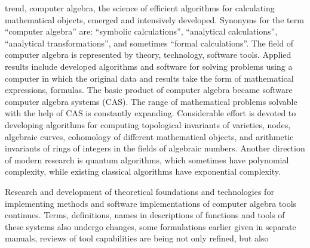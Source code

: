 \documentclass{article}
\begin{document}
\begin{multicols}{2}
trend, computer algebra, the science of efficient algorithms for calculating mathematical objects, emerged and
intensively developed. Synonyms for the term “computer
algebra” are: “symbolic calculations”, “analytical calculations”, “analytical transformations”, and sometimes
“formal calculations”. The field of computer algebra is
represented by theory, technology, software tools. Applied results include developed algorithms and software
for solving problems using a computer in which the
original data and results take the form of mathematical
expressions, formulas. The basic product of computer algebra became software computer algebra systems (CAS).
The range of mathematical problems solvable with the
help of CAS is constantly expanding. Considerable effort
is devoted to developing algorithms for computing topological invariants of varieties, nodes, algebraic curves,
cohomology of different mathematical objects, and arithmetic invariants of rings of integers in the fields of
algebraic numbers. Another direction of modern research
is quantum algorithms, which sometimes have polynomial complexity, while existing classical algorithms have
exponential complexity.
\par Research and development of theoretical foundations
and technologies for implementing methods and software
implementations of computer algebra tools continues.
Terms, definitions, names in descriptions of functions
and tools of these systems also undergo changes, some
formulations earlier given in separate manuals, reviews
of tool capabilities are being not only refined, but also


\end{multicols}
\end{document}
